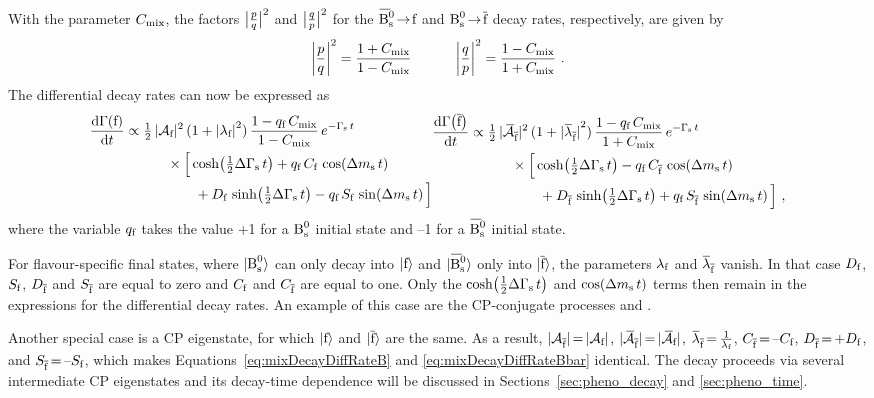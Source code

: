 With the parameter $C_\text{mix}$, the factors $\big|\tfrac{p}{q}\big|^2$ and $\big|\tfrac{q}{p}\big|^2$ for the $\Bsbartof$ and $\text{B}_\text{s}^\text{0}\!\to\!\overline{\text{f}}$ decay rates, respectively, are
given by
\begin{equation}
  \label{eq:CmpqqpSq}
  \left|\frac{p}{q}\right|^2 = \frac{1+C_\text{mix}}{1-C_\text{mix}} \qquad\quad \left|\frac{q}{p}\right|^2 = \frac{1-C_\text{mix}}{1+C_\text{mix}}
  \ .
\end{equation}
The differential decay rates can now be expressed as
\begin{subequations}
  \label{eq:mixDecayDiffRateAll}
  \begin{align}
    \label{eq:mixDecayDiffRateB}
    \frac{\ud\Gamma(\text{f})}{\ud t}
      &\propto \tfrac{1}{2}\, |\Af|^2\, (1+\lamfSq)\, \frac{1-\qf\,\Cm}{1-\Cm}\, \eGst \nonumber\\
      &\qquad\quad\times \Big[ \cDGs + \qf\,\Cf\,\cDms \nonumber\\
      &\qquad\qquad\quad + \Df\,\sDGs - \qf\,\Sf\,\sDms \Big]
  \end{align}
  \begin{align}
    \label{eq:mixDecayDiffRateBbar}
    \frac{\ud\Gamma\!\left(\overline{\text{f}}\right)}{\ud t}
      &\propto \tfrac{1}{2}\, |\Abarfbar|^2\, (1+\lamfbarSq)\, \frac{1-\qf\,\Cm}{1+\Cm}\, \eGst \nonumber\\
      &\qquad\quad\times \Big[ \cDGs - \qf\,\Cfbar\,\cDms \nonumber\\
      &\qquad\qquad\quad + \Dfbar\,\sDGs + \qf\,\Sfbar\,\sDms \Big]
    \ ,
  \end{align}
\end{subequations}
where the variable ${q_\text{f}}$ takes the value +1 for a $\text{B}_\text{s}^\text{0}$ initial state and --1 for a $\Bsbar$ initial state.

For flavour-specific final states, where $|\text{B}_\text{s}^\text{0}\rangle$ can only decay into $|\text{f}\rangle$ and $\Bsbarst$ only into $|\overline{\text{f}}\rangle$, the parameters $\lambda_{\text{f}}$ and
$\lamfbar$ vanish. In that case $D_{\text{f}}$, $S_{\text{f}}$, $D_{\overline{\text{f}}}$ and $S_{\overline{\text{f}}}$ are equal to zero and $C_{\text{f}}$ and $C_{\overline{\text{f}}}$ are equal to one. Only the
$\cosh\!\left(\tfrac{1}{2}\Delta\Gamma_\text{s}\, t\right)$ and $\cos\!\left(\Delta m_\text{s}\, t\right)$ terms then remain in the expressions for the differential decay rates. An example of this case are the CP-conjugate
processes \BstoDsmpip{} and \BsbartoDsppim.

Another special case is a CP eigenstate, for which $|\text{f}\rangle$ and $|\overline{\text{f}}\rangle$ are the same. As a result,
$|\mathcal{A}_{\overline{\text{f}}}|\text{\,=\,}|\mathcal{A}_{\text{f}}|$, $|\kern 0.23em \overline{\kern -0.23em \mathcal{A}}_{\overline{\text{f}}}|\text{\,=\,}|\kern 0.23em \overline{\kern -0.23em \mathcal{A}}_{\text{f}}|$, $\lamfbar\text{\texteq}\frac{\text{1}}{\lamf}$,
$C_{\overline{\text{f}}}\text{\,=\,}\text{--}C_{\text{f}}$, $D_{\overline{\text{f}}}\text{\,=\,}\text{+}D_{\text{f}}$, and $S_{\overline{\text{f}}}\text{\,=\,}\text{--}S_{\text{f}}$, which makes
Equations~\ref{eq:mixDecayDiffRateB} and \ref{eq:mixDecayDiffRateBbar} identical. The \BstoJpsiKK{} decay proceeds via several intermediate
CP eigenstates and its decay-time dependence will be discussed in Sections~\ref{sec:pheno_decay} and \ref{sec:pheno_time}.


